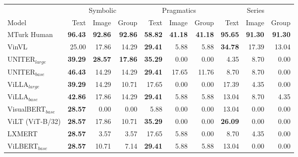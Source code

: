 \begin{table}[ht]
    \centering
   \begin{adjustbox}{max width=0.8\textwidth}
  \begin{tabular}{l|rrr|rrr|rrr}
    \toprule
     &
      \multicolumn{3}{c|}{Symbolic} &
      \multicolumn{3}{c|}{Pragmatics} &
      \multicolumn{3}{c}{Series} \\
    Model & Text & Image & Group & Text & Image & Group & Text & Image & Group \\\midrule
 MTurk Human                  & \textbf{96.43} & \textbf{92.86} & \textbf{92.86} & \textbf{58.82} & \textbf{41.18} & \textbf{41.18} & \textbf{95.65} & \textbf{91.30} & \textbf{91.30} \\
 VinVL                        & 25.00          & 17.86          & 14.29          & \textbf{29.41} & 5.88           & 5.88           & \textbf{34.78} & 17.39          & 13.04          \\
 UNITER$_{large}$             & \textbf{39.29} & \textbf{28.57} & \textbf{17.86} & \textbf{35.29} & 0.00           & 0.00           & 4.35           & 8.70           & 0.00           \\
 UNITER$_{base}$              & \textbf{46.43} & 14.29          & 14.29          & \textbf{29.41} & 17.65          & 11.76          & 8.70           & 8.70           & 0.00           \\
 ViLLA$_{large}$              & \textbf{39.29} & 14.29          & 10.71          & 17.65          & 0.00           & 0.00           & 17.39          & 4.35           & 0.00           \\
 ViLLA$_{base}$               & \textbf{42.86} & 17.86          & 14.29          & \textbf{29.41} & 5.88           & 5.88           & 13.04          & 8.70           & 4.35           \\
 VisualBERT$_{base}$          & \textbf{28.57} & 0.00           & 0.00           & 5.88           & 0.00           & 0.00           & 13.04          & 0.00           & 0.00           \\
 ViLT (ViT-B/32)              & \textbf{28.57} & 17.86          & 10.71          & \textbf{35.29} & 0.00           & 0.00           & \textbf{26.09} & 0.00           & 0.00           \\
 LXMERT                       & \textbf{28.57} & 3.57           & 3.57           & 17.65          & 5.88           & 0.00           & 8.70           & 4.35           & 0.00           \\
 ViLBERT$_{base}$             & \textbf{28.57} & 10.71          & 7.14           & \textbf{29.41} & 5.88           & 5.88           & 13.04          & 0.00           & 0.00           \\

\end{tabular}
\end{adjustbox}
\end{table}
